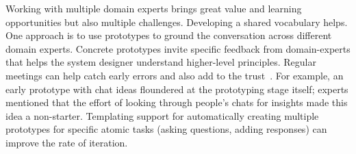 Working with multiple domain experts brings great value and learning opportunities but also multiple challenges. Developing a shared vocabulary helps. One approach is to use prototypes to ground the conversation across different domain experts. Concrete prototypes invite specific feedback from domain-experts that helps the system designer understand higher-level principles. Regular meetings can help catch early errors and also add to the trust~\cite{rocco1998trust}. For example, an early prototype with chat ideas floundered at the prototyping stage itself; experts mentioned that the effort of looking through people's chats for insights made this idea a non-starter. Templating support for automatically creating multiple prototypes for specific atomic tasks (asking questions, adding responses) can improve the rate of iteration.




%
%


